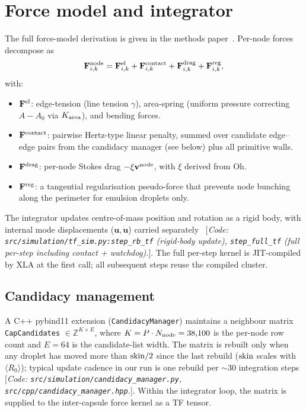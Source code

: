 \documentclass[aps,pre,twocolumn,floatfix,longbibliography]{revtex4-2}
\begin{document}
\section{Force model and integrator}
\label{sec:forces}

The full force-model derivation is given in the methods
paper~\cite{epd_methods}.  Per-node forces decompose as
\begin{equation}
\mathbf F^{\rm node}_{i,k} = \mathbf F^{\rm el}_{i,k}
  + \mathbf F^{\rm contact}_{i,k}
  + \mathbf F^{\rm drag}_{i,k}
  + \mathbf F^{\rm reg}_{i,k},
\end{equation}
with:
\begin{itemize}
\item $\mathbf F^{\rm el}$: edge-tension (line tension $\gamma$),
      area-spring (uniform pressure correcting $A - A_0$ via
      $K_{\rm area}$), and bending forces.
\item $\mathbf F^{\rm contact}$: pairwise Hertz-type linear penalty,
      summed over candidate edge--edge pairs from the candidacy
      manager (see below) plus all primitive walls.
\item $\mathbf F^{\rm drag}$: per-node Stokes drag
      $-\xi \mathbf v^{\rm node}$, with $\xi$ derived from
      $\mathrm{Oh}$.
\item $\mathbf F^{\rm reg}$: a tangential regularisation pseudo-force
      that prevents node bunching along the perimeter for emulsion
      droplets only.
\end{itemize}

The integrator updates centre-of-mass position and rotation as a rigid
body, with internal mode displacements ($\mathbf u, \dot{\mathbf u}$)
carried separately~ [\textit{Code:
\texttt{src/simulation/tf\_sim.py:step\_rb\_tf} (rigid-body update),
\texttt{step\_full\_tf} (full per-step including contact + watchdog).}].
The full per-step kernel is JIT-compiled by XLA at the first call;
all subsequent steps reuse the compiled cluster.

\subsection*{Candidacy management}
A C++ pybind11 extension (\texttt{CandidacyManager}) maintains a
neighbour matrix \texttt{CapCandidates} $\in \mathbb Z^{K \times E}$,
where $K = P \cdot N_{\rm node} = 38{,}100$ is the per-node row count
and $E = 64$ is the candidate-list width.  The matrix is rebuilt only
when any droplet has moved more than $\rm skin / 2$ since the last
rebuild ($\rm skin$ scales with $\langle R_0 \rangle$); typical update
cadence in our run is one rebuild per $\sim 30$ integration
steps~ [\textit{Code:
\texttt{src/simulation/candidacy\_manager.py},
\texttt{src/cpp/candidacy\_manager.hpp}.}].  Within the integrator
loop, the matrix is supplied to the inter-capsule force kernel as
a TF tensor.
\end{document}
